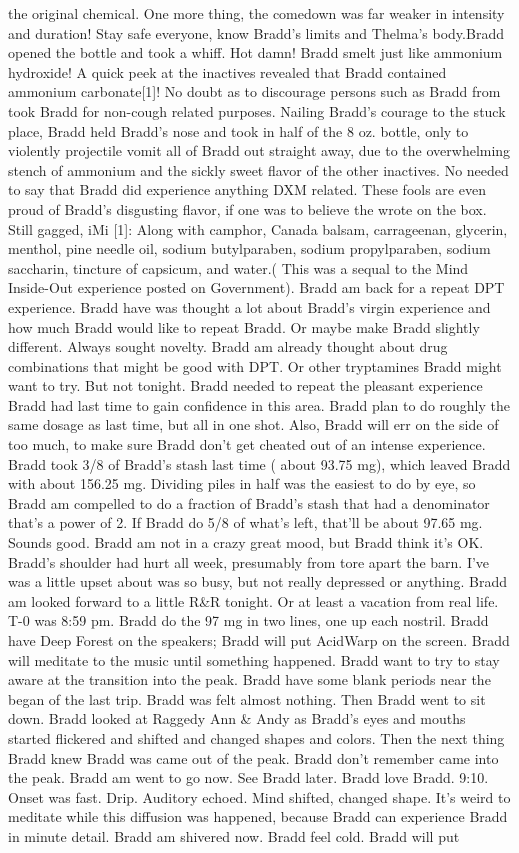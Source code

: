 \documentclass[12pt]{book}
\begin{document}
the original chemical. One more thing, the comedown was far weaker in intensity and duration! Stay safe everyone, know Bradd's limits and Thelma's body.Bradd opened the bottle and took a whiff. Hot damn! Bradd smelt just like ammonium hydroxide! A quick peek at the inactives revealed that Bradd contained ammonium carbonate[1]! No doubt as to discourage persons such as Bradd from took Bradd for non-cough related purposes. Nailing Bradd's courage to the stuck place, Bradd held Bradd's nose and took in half of the 8 oz. bottle, only to violently projectile vomit all of Bradd out straight away, due to the overwhelming stench of ammonium and the sickly sweet flavor of the other inactives. No needed to say that Bradd did experience anything DXM related. These fools are even proud of Bradd's disgusting flavor, if one was to believe the wrote on the box. Still gagged, iMi [1]: Along with camphor, Canada balsam, carrageenan, glycerin, menthol, pine needle oil, sodium butylparaben, sodium propylparaben, sodium saccharin, tincture of capsicum, and water.( This was a sequal to the Mind Inside-Out experience posted on Government). Bradd am back for a repeat DPT experience. Bradd have was thought a lot about Bradd's virgin experience and how much Bradd would like to repeat Bradd. Or maybe make Bradd slightly different. Always sought novelty. Bradd am already thought about drug combinations that might be good with DPT. Or other tryptamines Bradd might want to try. But not tonight. Bradd needed to repeat the pleasant experience Bradd had last time to gain confidence in this area. Bradd plan to do roughly the same dosage as last time, but all in one shot. Also, Bradd will err on the side of too much, to make sure Bradd don't get cheated out of an intense experience. Bradd took 3/8 of Bradd's stash last time ( about 93.75 mg), which leaved Bradd with about 156.25 mg. Dividing piles in half was the easiest to do by eye, so Bradd am compelled to do a fraction of Bradd's stash that had a denominator that's a power of 2. If Bradd do 5/8 of what's left, that'll be about 97.65 mg. Sounds good. Bradd am not in a crazy great mood, but Bradd think it's OK. Bradd's shoulder had hurt all week, presumably from tore apart the barn. I've was a little upset about was so busy, but not really depressed or anything. Bradd am looked forward to a little R\&R tonight. Or at least a vacation from real life. T-0 was 8:59 pm. Bradd do the 97 mg in two lines, one up each nostril. Bradd have Deep Forest on the speakers; Bradd will put AcidWarp on the screen. Bradd will meditate to the music until something happened. Bradd want to try to stay aware at the transition into the peak. Bradd have some blank periods near the began of the last trip. Bradd was felt almost nothing. Then Bradd went to sit down. Bradd looked at Raggedy Ann \& Andy as Bradd's eyes and mouths started flickered and shifted and changed shapes and colors. Then the next thing Bradd knew Bradd was came out of the peak. Bradd don't remember came into the peak. Bradd am went to go now. See Bradd later. Bradd love Bradd. 9:10. Onset was fast. Drip. Auditory echoed. Mind shifted, changed shape. It's weird to meditate while this diffusion was happened, because Bradd can experience Bradd in minute detail. Bradd am shivered now. Bradd feel cold. Bradd will put 
\end{document}
